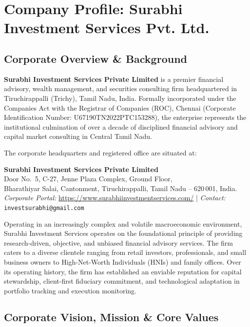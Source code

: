\chapter{Company Profile: Surabhi Investment Services Pvt. Ltd.}
\label{chap:company_profile}

\section{Corporate Overview \& Background}
\textbf{Surabhi Investment Services Private Limited} is a premier financial advisory, wealth management, and securities consulting firm headquartered in Tiruchirappalli (Trichy), Tamil Nadu, India. Formally incorporated under the Companies Act with the Registrar of Companies (ROC), Chennai (Corporate Identification Number: U67190TN2022PTC153288), the enterprise represents the institutional culmination of over a decade of disciplined financial advisory and capital market consulting in Central Tamil Nadu.

The corporate headquarters and registered office are situated at:
\begin{center}
    \small
    \textbf{Surabhi Investment Services Private Limited} \\
    Door No.~5, C-27, Jenne Plaza Complex, Ground Floor, \\
    Bharathiyar Salai, Cantonment, Tiruchirappalli, Tamil Nadu -- 620\,001, India. \\
    \textit{Corporate Portal:} \url{https://www.surabhiinvestmentservices.com/} \quad | \quad \textit{Contact:} \texttt{investsurabhi@gmail.com}
\end{center}

Operating in an increasingly complex and volatile macroeconomic environment, Surabhi Investment Services operates on the foundational principle of providing research-driven, objective, and unbiased financial advisory services. The firm caters to a diverse clientele ranging from retail investors, professionals, and small business owners to High-Net-Worth Individuals (HNIs) and family offices. Over its operating history, the firm has established an enviable reputation for capital stewardship, client-first fiduciary commitment, and technological adaptation in portfolio tracking and execution monitoring.

\section{Corporate Vision, Mission \& Core Values}

